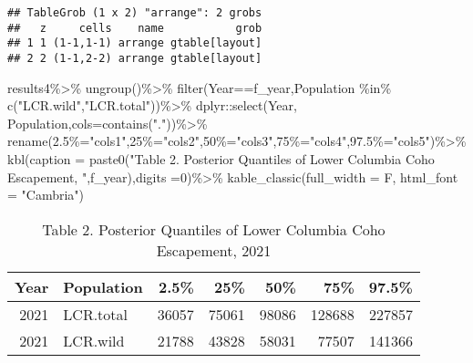 \documentclass[
]{article}
\newenvironment{Shaded}{\begin{snugshade}}{\end{snugshade}}
\newcommand{\AttributeTok}[1]{\textcolor[rgb]{0.77,0.63,0.00}{#1}}
\newcommand{\DecValTok}[1]{\textcolor[rgb]{0.00,0.00,0.81}{#1}}
\newcommand{\FunctionTok}[1]{\textcolor[rgb]{0.00,0.00,0.00}{#1}}
\newcommand{\NormalTok}[1]{#1}
\newcommand{\OtherTok}[1]{\textcolor[rgb]{0.56,0.35,0.01}{#1}}
\newcommand{\SpecialCharTok}[1]{\textcolor[rgb]{0.00,0.00,0.00}{#1}}
\newcommand{\StringTok}[1]{\textcolor[rgb]{0.31,0.60,0.02}{#1}}
\begin{document}
\begin{verbatim}
## TableGrob (1 x 2) "arrange": 2 grobs
##   z     cells    name           grob
## 1 1 (1-1,1-1) arrange gtable[layout]
## 2 2 (1-1,2-2) arrange gtable[layout]
\end{verbatim}

\begin{Shaded}
\begin{Highlighting}[]
\NormalTok{results4}\SpecialCharTok{\%\textgreater{}\%}
  \FunctionTok{ungroup}\NormalTok{()}\SpecialCharTok{\%\textgreater{}\%}
  \FunctionTok{filter}\NormalTok{(Year}\SpecialCharTok{==}\NormalTok{f\_year,Population }\SpecialCharTok{\%in\%} \FunctionTok{c}\NormalTok{(}\StringTok{"LCR.wild"}\NormalTok{,}\StringTok{"LCR.total"}\NormalTok{))}\SpecialCharTok{\%\textgreater{}\%}
\NormalTok{  dplyr}\SpecialCharTok{::}\FunctionTok{select}\NormalTok{(Year, Population,}\AttributeTok{cols=}\FunctionTok{contains}\NormalTok{(}\StringTok{"."}\NormalTok{))}\SpecialCharTok{\%\textgreater{}\%}
  \FunctionTok{rename}\NormalTok{(}\StringTok{\textasciigrave{}}\AttributeTok{2.5\%}\StringTok{\textasciigrave{}}\OtherTok{=}\StringTok{"cols1"}\NormalTok{,}\StringTok{\textasciigrave{}}\AttributeTok{25\%}\StringTok{\textasciigrave{}}\OtherTok{=}\StringTok{"cols2"}\NormalTok{,}\StringTok{\textasciigrave{}}\AttributeTok{50\%}\StringTok{\textasciigrave{}}\OtherTok{=}\StringTok{"cols3"}\NormalTok{,}\StringTok{\textasciigrave{}}\AttributeTok{75\%}\StringTok{\textasciigrave{}}\OtherTok{=}\StringTok{"cols4"}\NormalTok{,}\StringTok{\textasciigrave{}}\AttributeTok{97.5\%}\StringTok{\textasciigrave{}}\OtherTok{=}\StringTok{"cols5"}\NormalTok{)}\SpecialCharTok{\%\textgreater{}\%}
  \FunctionTok{kbl}\NormalTok{(}\AttributeTok{caption =} \FunctionTok{paste0}\NormalTok{(}\StringTok{"Table 2. Posterior Quantiles of Lower Columbia Coho Escapement, "}\NormalTok{,f\_year),}\AttributeTok{digits =}\DecValTok{0}\NormalTok{)}\SpecialCharTok{\%\textgreater{}\%}
  \FunctionTok{kable\_classic}\NormalTok{(}\AttributeTok{full\_width =}\NormalTok{ F, }\AttributeTok{html\_font =} \StringTok{"Cambria"}\NormalTok{)}
\end{Highlighting}
\end{Shaded}

\begin{table}

\caption{\label{tab:fitmodels2}Table 2. Posterior Quantiles of Lower Columbia Coho Escapement, 2021}
\centering
\begin{tabular}[t]{r|l|r|r|r|r|r}
\hline
Year & Population & 2.5\% & 25\% & 50\% & 75\% & 97.5\%\\
\hline
2021 & LCR.total & 36057 & 75061 & 98086 & 128688 & 227857\\
\hline
2021 & LCR.wild & 21788 & 43828 & 58031 & 77507 & 141366\\
\hline
\end{tabular}
\end{table}
\end{document}
